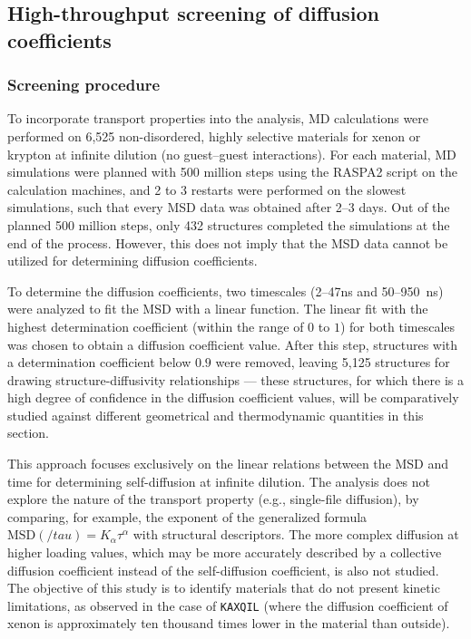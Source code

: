 \documentclass[main]{subfiles}
\begin{document}
\subsection{High-throughput screening of diffusion coefficients}

\subsubsection{Screening procedure}

To incorporate transport properties into the analysis, MD calculations were performed on 6,525 non-disordered, highly selective materials for xenon or krypton at infinite dilution (no guest--guest interactions). For each material, MD simulations were planned with 500 million steps using the RASPA2 script on the calculation machines, and 2 to 3 restarts were performed on the slowest simulations, such that every MSD data was obtained after 2--3 days. Out of the planned 500 million steps, only 432 structures completed the simulations at the end of the process. However, this does not imply that the MSD data cannot be utilized for determining diffusion coefficients.

To determine the diffusion coefficients, two timescales (2--47\si{\ns} and 50--950~\si{\ns}) were analyzed to fit the MSD with a linear function. The linear fit with the highest determination coefficient (within the range of $0$ to $1$) for both timescales was chosen to obtain a diffusion coefficient value. After this step, structures with a determination coefficient below $0.9$ were removed, leaving 5,125 structures for drawing structure-diffusivity relationships --- these structures, for which there is a high degree of confidence in the diffusion coefficient values, will be comparatively studied against different geometrical and thermodynamic quantities in this section.

This approach focuses exclusively on the linear relations between the MSD and time for determining self-diffusion at infinite dilution. The analysis does not explore the nature of the transport property (e.g., single-file diffusion\autocite{Lin_2005}), by comparing, for example, the exponent of the generalized formula $\text{MSD}(/tau) = K_\alpha\tau^\alpha$ with structural descriptors. The more complex diffusion at higher loading values, which may be more accurately described by a collective diffusion coefficient instead of the self-diffusion coefficient, is also not studied. The objective of this study is to identify materials that do not present kinetic limitations, as observed in the case of \texttt{KAXQIL}\autocite{Banerjee2012} (where the diffusion coefficient of xenon is approximately ten thousand times lower in the material than outside).
\end{document}
